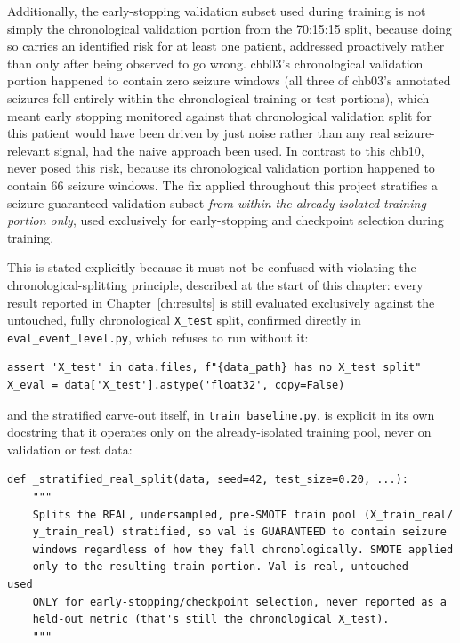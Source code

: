  
Additionally, the early-stopping validation subset used during training is not simply the chronological validation portion from the 70:15:15 split, because doing so carries an identified risk for 
at least one patient, addressed proactively rather than only after being observed to go wrong. chb03's chronological validation portion happened to contain zero 
seizure windows (all three of chb03's annotated seizures fell entirely within the chronological training or test portions), which meant early stopping monitored against that 
chronological validation split for this patient would have been driven by just noise rather than any real seizure-relevant signal, had the naive approach been used.
In contrast to this chb10, never posed this risk, because its chronological validation portion happened to contain 66 seizure windows. The fix applied throughout this project stratifies a seizure-guaranteed validation subset \emph{from within the 
already-isolated training portion only}, used exclusively for early-stopping and checkpoint selection during training. 

This is stated explicitly because it must not be confused with violating the chronological-splitting principle, described at the start of this chapter: 
every result reported in Chapter~\ref{ch:results} is still evaluated exclusively against the untouched, fully chronological \texttt{X\_test} split, confirmed directly 
in \texttt{eval\_event\_level.py}, which refuses to run without it:

\begin{verbatim}
assert 'X_test' in data.files, f"{data_path} has no X_test split"
X_eval = data['X_test'].astype('float32', copy=False)
\end{verbatim}

\noindent and the stratified carve-out itself, in \texttt{train\_baseline.py}, is explicit in its own docstring that it operates only on the already-isolated training pool, never on 
validation or test data:

\begin{verbatim}
def _stratified_real_split(data, seed=42, test_size=0.20, ...):
    """
    Splits the REAL, undersampled, pre-SMOTE train pool (X_train_real/
    y_train_real) stratified, so val is GUARANTEED to contain seizure
    windows regardless of how they fall chronologically. SMOTE applied
    only to the resulting train portion. Val is real, untouched -- used
    ONLY for early-stopping/checkpoint selection, never reported as a
    held-out metric (that's still the chronological X_test).
    """
\end{verbatim}

